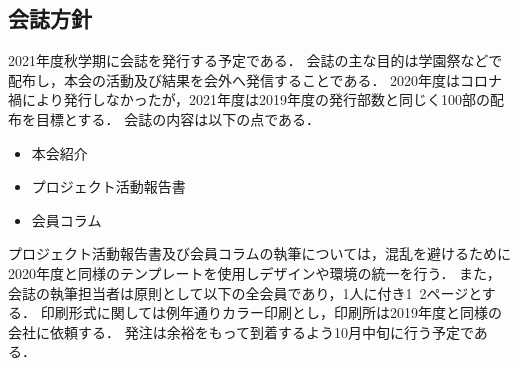 \subsection*{会誌方針}


2021年度秋学期に会誌を発行する予定である．
会誌の主な目的は学園祭などで配布し，本会の活動及び結果を会外へ発信することである．
2020年度はコロナ禍により発行しなかったが，2021年度は2019年度の発行部数と同じく100部の配布を目標とする．
会誌の内容は以下の点である．
\begin{itemize}
	\item 本会紹介
	\item プロジェクト活動報告書
	\item 会員コラム
\end{itemize}
プロジェクト活動報告書及び会員コラムの執筆については，混乱を避けるために2020年度と同様のテンプレートを使用しデザインや環境の統一を行う．
また，会誌の執筆担当者は原則として\thirdGrade{}以下の全会員であり，1人に付き1~2ページとする．
印刷形式に関しては例年通りカラー印刷とし，印刷所は2019年度と同様の会社に依頼する．
発注は余裕をもって到着するよう10月中旬に行う予定である．
